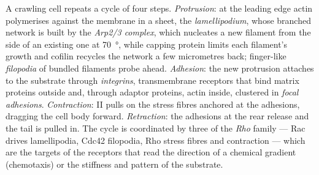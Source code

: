 \begin{definition}\label{def:b3:cytoskeleton-motility:migration}
A crawling cell repeats a cycle of four steps. \emph{Protrusion}: at
the leading edge actin polymerises against the membrane in a sheet, the
\emph{lamellipodium}, whose branched network is built by the
\emph{Arp2/3 complex}, which nucleates a new filament from the side of
an existing one at \qty{70}{\degree}, while capping protein limits each
filament's growth and cofilin recycles the network a few micrometres
back; finger-like \emph{filopodia} of bundled filaments probe ahead.
\emph{Adhesion}: the new protrusion attaches to the substrate through
\emph{integrins}, transmembrane receptors that bind matrix proteins
outside and, through adaptor proteins, actin inside, clustered in
\emph{focal adhesions}. \emph{Contraction}:  II pulls on the
stress fibres anchored at the adhesions, dragging the cell body
forward. \emph{Retraction}: the adhesions at the rear release and the
tail is pulled in. The cycle is coordinated by three  of
the \emph{Rho} family --- Rac drives lamellipodia, Cdc42 filopodia,
Rho stress fibres and contraction --- which are the targets of the
receptors that read the direction of a chemical gradient
(chemotaxis) or the stiffness and pattern of the substrate.
\end{definition}

